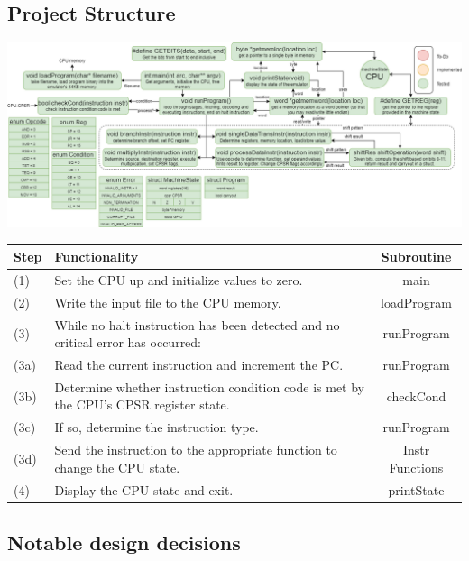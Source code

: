 \documentclass[11pt]{article}
\begin{document}
    \subsection*{Project Structure}
        \begin{center}
            \includegraphics[width = \textwidth]{project_status}
        \end{center}
    \begin{center}
        \begin{tabular}{l | l | c}
            \textbf{Step} & \textbf{Functionality} & \textbf{Subroutine} \\
            \hline
            (1) & Set the CPU up and initialize values to zero. & \textcolor{OliveGreen}{main} \\
            (2) & Write the input file to the CPU memory. & \textcolor{OliveGreen}{loadProgram}\\
            (3) & While no halt instruction has been detected and no critical error has occurred: & \textcolor{OliveGreen}{runProgram} \\
            (3a) & Read the current instruction and increment the PC.  & \textcolor{OliveGreen}{runProgram}\\
            (3b) & Determine whether instruction condition code is met by the CPU's CPSR register state. & \textcolor{OliveGreen}{checkCond}\\
            (3c) & If so, determine the instruction type.  & \textcolor{OliveGreen}{runProgram}\\
            (3d) & Send the instruction to the appropriate function to change the CPU state. & \textcolor{OliveGreen}{Instr Functions}\\
            (4) & Display the CPU state and exit. & \textcolor{OliveGreen}{printState} \\
        \end{tabular}
    \end{center}
    
    \subsection*{Notable design decisions}
\end{document}
